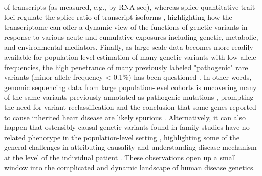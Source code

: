 \documentclass[letter]{bib}
\begin{document}
of transcripts (as measured, e.g., by RNA-seq), whereas splice quantitative trait loci regulate the splice ratio of transcript isoforms \citep{Lau:2018:Omics}, highlighting how the transcriptome can offer a dynamic view of the functions of genetic variants in response to various acute and cumulative exposures including genetic, metabolic, and environmental mediators.  Finally, as large-scale data becomes more readily available for population-level estimation of many genetic variants with low allele frequencies, the high penetrance of many previously labeled "pathogenic" rare variants (minor allele frequency < 0.1\%) has been questioned \citep{Lek:2016:Analysis}.  In other words, genomic sequencing data from large population-level cohorts is uncovering many of the same variants previously annotated as pathogenic mutations \citep{Lek:2016:Analysis,Walsh:2017:Reassessment}, prompting the need for variant reclassification and the conclusion that some genes reported to cause inherited heart disease are likely spurious \citep{Macrae:2017:Closing}. Alternatively, it can also happen that ostensibly causal genetic variants found in family studies have no related phenotype in the population-level setting \citep{Manrai:2016:Clinical}, highlighting some of the general challenges in attributing causality and understanding disease mechanism at the level of the individual patient \citep{Macrae:2017:Closing}.  These observations open up a small window into the complicated and dynamic landscape of human disease genetics.  
\end{document}

